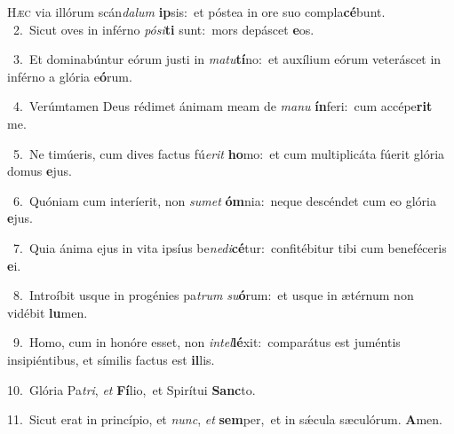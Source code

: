 \lettrine{\initial\textcolor{\initialcolor}{H}}{æc} via illórum scán\-\textit{da}\-\textit{lum} \textbf{ip}\-sis:~\star et póstea in ore suo compla\-\textbf{cé}\-bunt.\\
{\numbfont\textcolor{\numbcolor}{~2.}}~Sicut oves in inférno \textit{pó}\-\textit{si}\textbf{ti} sunt:~\star mors depáscet \textbf{e}\-os.\par
{\numbfont\textcolor{\numbcolor}{~3.}}~Et dominabúntur eórum justi in \textit{ma}\-\textit{tu}\textbf{tí}no:~\star et auxílium eórum veteráscet in inférno a glória e\-\textbf{ó}\-rum.\par
{\numbfont\textcolor{\numbcolor}{~4.}}~Verúmtamen Deus rédimet ánimam meam de \textit{ma}\-\textit{nu} \textbf{ín}\-feri:~\star cum accépe\textbf{rit} me.\par
{\numbfont\textcolor{\numbcolor}{~5.}}~Ne timúeris, cum dives factus fú\-\textit{e}\-\textit{rit} \textbf{ho}\-mo:~\star et cum multiplicáta fúerit glória domus \textbf{e}\-jus.\par
{\numbfont\textcolor{\numbcolor}{~6.}}~Quóniam cum interíerit, non \textit{su}\-\textit{met} \textbf{óm}\-nia:~\star neque descéndet cum eo glória \textbf{e}\-jus.\par
{\numbfont\textcolor{\numbcolor}{~7.}}~Quia ánima ejus in vita ipsíus be\-\textit{ne}\-\textit{di}\textbf{cé}tur:~\star confitébitur tibi cum beneféceris \textbf{e}\-i.\par
{\numbfont\textcolor{\numbcolor}{~8.}}~Introíbit usque in progénies pa\textit{trum} \textit{su}\-\textbf{ó}rum:~\star et usque in ætérnum non vidébit \textbf{lu}\-men.\par
{\numbfont\textcolor{\numbcolor}{~9.}}~Homo, cum in honóre esset, non \textit{in}\-\textit{tel}\textbf{lé}xit:~\star comparátus est juméntis insipiéntibus, et símilis factus est \textbf{il}\-lis.\par
{\numbfont\textcolor{\numbcolor}{10.}}~Glória Pa\-\textit{tri}\-, \textit{et} \textbf{Fí}\-lio,~\star et Spirítui \textbf{Sanc}\-to.\par
{\numbfont\textcolor{\numbcolor}{11.}}~Sicut erat in princípio, et \textit{nunc}\-, \textit{et} \textbf{sem}\-per,~\star et in sǽcula sæculórum. \textbf{A}\-men.\par
